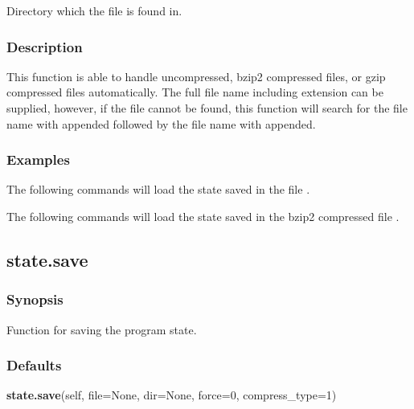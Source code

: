   Directory which the file is found in.

\subsubsection{Description}

This function is able to handle uncompressed, bzip2 compressed files, or gzip compressed
files automatically.  The full file name including extension can be supplied, however, if
the file cannot be found, this function will search for the file name with 
 appended
followed by the file name with 
 appended.


\subsubsection{Examples}

The following commands will load the state saved in the file 
.





The following commands will load the state saved in the bzip2 compressed file 
.







\newpage

\subsection{state.save}


\subsubsection{Synopsis}

Function for saving the program state.

\subsubsection{Defaults}

\textsf{\textbf{state.save}(self, file=None, dir=None, force=0, compress\_type=1)}


